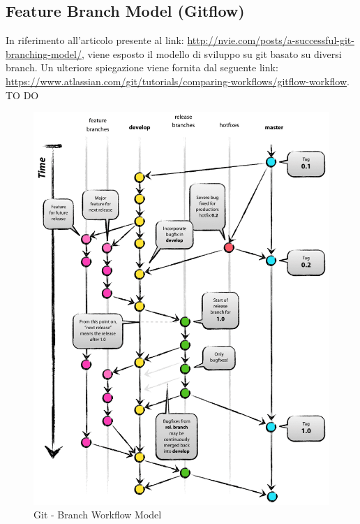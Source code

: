 	\subsection{Feature Branch Model (Gitflow)} %
	\label{sub:branching_model}
	In riferimento all'articolo presente al link: \newline
	\url{http://nvie.com/posts/a-successful-git-branching-model/}, viene esposto il modello di sviluppo su git basato su diversi branch. Un ulteriore spiegazione viene fornita dal seguente link: \url{https://www.atlassian.com/git/tutorials/comparing-workflows/gitflow-workflow}. \newline
	TO DO
	\begin{figure}[htbp]
		\centering
		\includegraphics[scale=0.4]{images/git_branch_workflow.png}
		\caption{Git - Branch Workflow Model}
		\label{fig:git_branch_workflow_model}
	\end{figure}


\newpage \clearpage